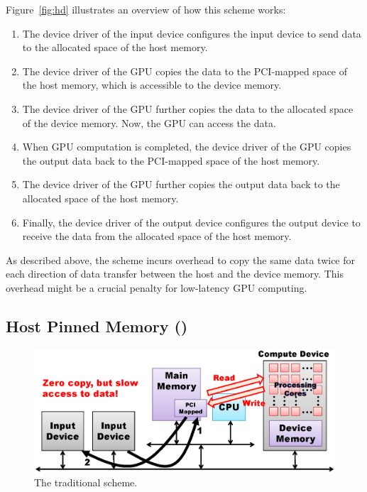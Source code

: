 Figure~\ref{fig:hd} illustrates an overview of how this scheme works:
\begin{enumerate}
 \item The device driver of the input device configures the input device
       to send data to the allocated space of the host memory.
 \item The device driver of the GPU copies the data to the
       PCI-mapped space of the host memory, which is accessible to the
       device memory.
 \item The device driver of the GPU further copies the data to the
       allocated space of the device memory.
       Now, the GPU can access the data.
 \item When GPU computation is completed, the device driver of the
       GPU copies the output data back to the PCI-mapped space of the
       host memory.
 \item The device driver of the GPU further copies the output data back
       to the allocated space of the host memory.
 \item Finally, the device driver of the output device configures the
       output device to receive the data from the allocated space of the
       host memory.
\end{enumerate}

As described above, the {\hd} scheme incurs overhead to copy the same
data twice for each direction of data transfer between the host and the
device memory.
This overhead might be a crucial penalty for low-latency GPU computing.

\subsection{Host Pinned Memory ({\hp})}
\label{sec:hp}

\begin{figure}[!t]
 \centering
 \includegraphics[width=\hsize]{eps/hp.eps}
 \caption{The traditional {\hp} scheme.}
 \label{fig:hp}
\end{figure}

